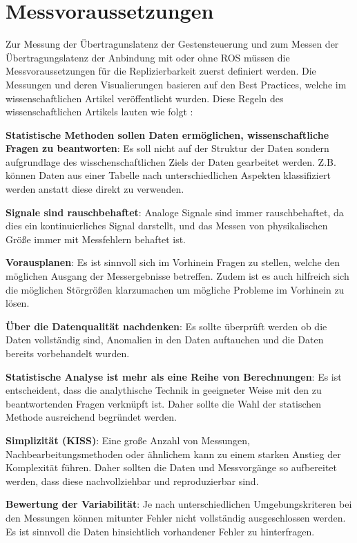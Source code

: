 \section{Messvoraussetzungen}
Zur Messung der Übertragunslatenz der Gestensteuerung und zum Messen der Übertragungslatenz der Anbindung mit oder ohne ROS müssen die Messvoraussetzungen für die Replizierbarkeit zuerst definiert werden. Die Messungen und deren Visualierungen basieren auf den Best Practices, welche im wissenschaftlichen Artikel  veröffentlicht wurden. Diese Regeln des wissenschaftlichen Artikels lauten wie folgt \cite{kass_ten_2016}:
\begin{compactenumerate}
    \item \textbf{Statistische Methoden sollen Daten ermöglichen, wissenschaftliche Fragen zu beantworten}: Es soll nicht auf der Struktur der Daten sondern aufgrundlage des wisschenschaftlichen Ziels der Daten gearbeitet werden. Z.B. können Daten aus einer Tabelle nach unterschiedlichen Aspekten klassifiziert werden anstatt diese direkt zu verwenden.
    \item \textbf{Signale sind rauschbehaftet}: Analoge Signale sind immer rauschbehaftet, da dies ein kontinuierliches Signal darstellt, und das Messen von physikalischen Größe immer mit Messfehlern behaftet ist.
    \item \textbf{Vorausplanen}: Es ist sinnvoll sich im Vorhinein Fragen zu stellen, welche den möglichen Ausgang der Messergebnisse betreffen. Zudem ist es auch hilfreich sich die möglichen Störgrößen klarzumachen um mögliche Probleme im Vorhinein zu lösen.
    \item \textbf{Über die Datenqualität nachdenken}: Es sollte überprüft werden ob die Daten vollständig sind, Anomalien in den Daten auftauchen und die Daten bereits vorbehandelt wurden.
    \item \textbf{Statistische Analyse ist mehr als eine Reihe von Berechnungen}: Es ist entscheident, dass die analythische Technik in geeigneter Weise mit den zu beantwortenden Fragen verknüpft ist. Daher sollte die Wahl der statischen Methode ausreichend begründet werden.
    \item \textbf{Simplizität (KISS)}: Eine große Anzahl von Messungen, Nachbearbeitungsmethoden oder ähnlichem kann zu einem starken Anstieg der Komplexität führen. Daher sollten die Daten und Messvorgänge so aufbereitet werden, dass diese nachvollziehbar und reproduzierbar sind.
    \item \textbf{Bewertung der Variabilität}: Je nach unterschiedlichen Umgebungskriteren bei den Messungen können mitunter Fehler nicht vollständig ausgeschlossen werden. Es ist sinnvoll die Daten hinsichtlich vorhandener Fehler zu hinterfragen.

\end{compactenumerate}
